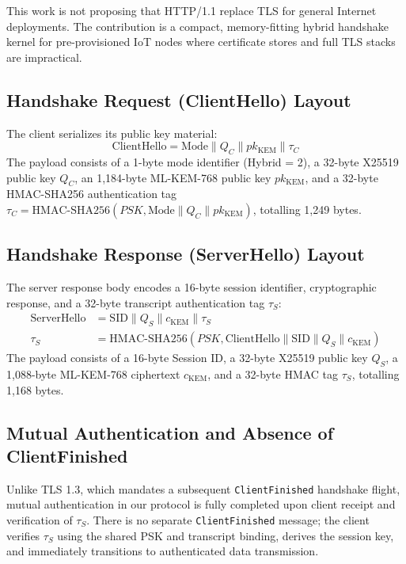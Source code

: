 \documentclass[journal, 10pt]{IEEEtran}
\begin{document}
This work is not proposing that HTTP/1.1 replace TLS for general Internet deployments. The contribution is a compact, memory-fitting hybrid handshake kernel for pre-provisioned IoT nodes where certificate stores and full TLS stacks are impractical.

\subsection{Handshake Request (ClientHello) Layout}
The client serializes its public key material:
\begin{equation}
\text{ClientHello} = \text{Mode} \parallel Q_C \parallel pk_{\text{KEM}} \parallel \tau_C
\end{equation}
The payload consists of a 1-byte mode identifier (Hybrid = 2), a 32-byte X25519 public key $Q_C$, an 1,184-byte ML-KEM-768 public key $pk_{\text{KEM}}$, and a 32-byte HMAC-SHA256 authentication tag $\tau_C = \text{HMAC-SHA256}(PSK, \text{Mode} \parallel Q_C \parallel pk_{\text{KEM}})$, totalling 1,249 bytes.

\subsection{Handshake Response (ServerHello) Layout}
The server response body encodes a 16-byte session identifier, cryptographic response, and a 32-byte transcript authentication tag $\tau_S$:
\begin{equation}
\begin{aligned}
\text{ServerHello} &= \text{SID} \parallel Q_S \parallel c_{\text{KEM}} \parallel \tau_S \\
\tau_S &= \text{HMAC-SHA256}(PSK, \text{ClientHello} \parallel \text{SID} \parallel Q_S \parallel c_{\text{KEM}})
\end{aligned}
\end{equation}
The payload consists of a 16-byte Session ID, a 32-byte X25519 public key $Q_S$, a 1,088-byte ML-KEM-768 ciphertext $c_{\text{KEM}}$, and a 32-byte HMAC tag $\tau_S$, totalling 1,168 bytes.

\subsection{Mutual Authentication and Absence of ClientFinished}
Unlike TLS 1.3, which mandates a subsequent \texttt{ClientFinished} handshake flight, mutual authentication in our protocol is fully completed upon client receipt and verification of $\tau_S$. There is no separate \texttt{ClientFinished} message; the client verifies $\tau_S$ using the shared PSK and transcript binding, derives the session key, and immediately transitions to authenticated data transmission.
\end{document}
